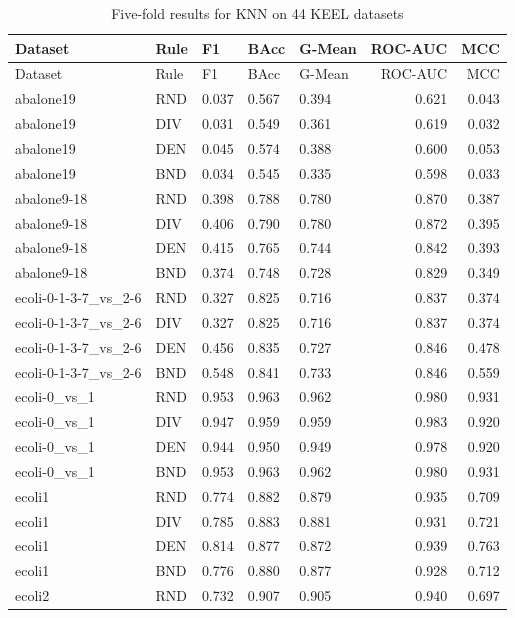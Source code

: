 \documentclass[10pt,a4paper]{article}
\begin{document}
\begingroup\small\setlength{\tabcolsep}{4pt}
\begin{longtable}{lllllrr}
\caption{Five-fold results for KNN on 44 KEEL datasets}\label{tab:s2}\\
\toprule
Dataset & Rule & F1 & BAcc & G-Mean & ROC-AUC & MCC \\
\midrule
\endfirsthead
\toprule
Dataset & Rule & F1 & BAcc & G-Mean & ROC-AUC & MCC \\
\midrule
\endhead
\bottomrule
\endlastfoot
abalone19 & RND & 0.037 & 0.567 & 0.394 & 0.621 & 0.043 \\
abalone19 & DIV & 0.031 & 0.549 & 0.361 & 0.619 & 0.032 \\
abalone19 & DEN & 0.045 & 0.574 & 0.388 & 0.600 & 0.053 \\
abalone19 & BND & 0.034 & 0.545 & 0.335 & 0.598 & 0.033 \\
abalone9-18 & RND & 0.398 & 0.788 & 0.780 & 0.870 & 0.387 \\
abalone9-18 & DIV & 0.406 & 0.790 & 0.780 & 0.872 & 0.395 \\
abalone9-18 & DEN & 0.415 & 0.765 & 0.744 & 0.842 & 0.393 \\
abalone9-18 & BND & 0.374 & 0.748 & 0.728 & 0.829 & 0.349 \\
ecoli-0-1-3-7\_vs\_2-6 & RND & 0.327 & 0.825 & 0.716 & 0.837 & 0.374 \\
ecoli-0-1-3-7\_vs\_2-6 & DIV & 0.327 & 0.825 & 0.716 & 0.837 & 0.374 \\
ecoli-0-1-3-7\_vs\_2-6 & DEN & 0.456 & 0.835 & 0.727 & 0.846 & 0.478 \\
ecoli-0-1-3-7\_vs\_2-6 & BND & 0.548 & 0.841 & 0.733 & 0.846 & 0.559 \\
ecoli-0\_vs\_1 & RND & 0.953 & 0.963 & 0.962 & 0.980 & 0.931 \\
ecoli-0\_vs\_1 & DIV & 0.947 & 0.959 & 0.959 & 0.983 & 0.920 \\
ecoli-0\_vs\_1 & DEN & 0.944 & 0.950 & 0.949 & 0.978 & 0.920 \\
ecoli-0\_vs\_1 & BND & 0.953 & 0.963 & 0.962 & 0.980 & 0.931 \\
ecoli1 & RND & 0.774 & 0.882 & 0.879 & 0.935 & 0.709 \\
ecoli1 & DIV & 0.785 & 0.883 & 0.881 & 0.931 & 0.721 \\
ecoli1 & DEN & 0.814 & 0.877 & 0.872 & 0.939 & 0.763 \\
ecoli1 & BND & 0.776 & 0.880 & 0.877 & 0.928 & 0.712 \\
ecoli2 & RND & 0.732 & 0.907 & 0.905 & 0.940 & 0.697 \\

\end{longtable}
\end{document}
